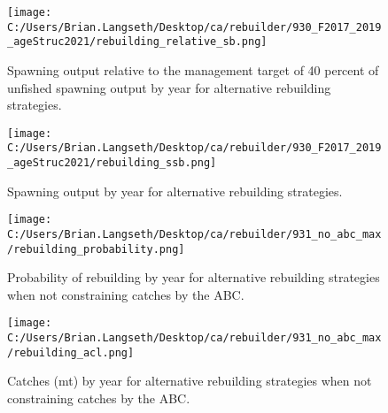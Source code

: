 \documentclass[11pt,
  english,
  a4paper,
]{article}
\begin{document}
\tagmcend\tagstructend


\begin{figure}
\centering
\texttt{[image: C:/Users/Brian.Langseth/Desktop/ca/rebuilder/930\_F2017\_2019\_ageStruc2021/rebuilding\_relative\_sb.png]}
\caption{Spawning output relative to the management target of 40 percent of unfished spawning output by year for alternative rebuilding strategies.\label{fig:rel-ssb-fig}}
\end{figure}

\tagmcend\tagstructend


\begin{figure}
\centering
\texttt{[image: C:/Users/Brian.Langseth/Desktop/ca/rebuilder/930\_F2017\_2019\_ageStruc2021/rebuilding\_ssb.png]}
\caption{Spawning output by year for alternative rebuilding strategies.\label{fig:rel-ssb-fig}}
\end{figure}

\tagmcend\tagstructend


\begin{figure}
\centering
\texttt{[image: C:/Users/Brian.Langseth/Desktop/ca/rebuilder/931\_no\_abc\_max/rebuilding\_probability.png]}
\caption{Probability of rebuilding by year for alternative rebuilding strategies when not constraining catches by the ABC.\label{fig:prob-fig-noABCmax}}
\end{figure}

\tagmcend\tagstructend


\begin{figure}
\centering
\texttt{[image: C:/Users/Brian.Langseth/Desktop/ca/rebuilder/931\_no\_abc\_max/rebuilding\_acl.png]}
\caption{Catches (mt) by year for alternative rebuilding strategies when not constraining catches by the ABC.\label{fig:acl-fig-noABCmax}}
\end{figure}
\end{document}
